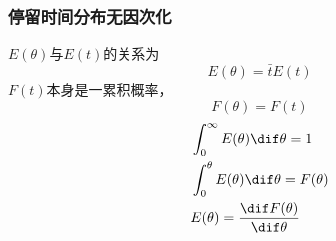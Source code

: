 \begin{frame}
    \frametitle{停留时间分布无因次化}

    $E(\theta)$与$E(t)$的关系为
    \[
        E(\theta) = \bar{t} E(t)
    \]
    $F(t)$本身是一累积概率，
    \[
        F(\theta) = F(t)
    \]
    \[
        \begin{aligned}
            &\int_0^\infty E(\theta)\dif \theta =1   \\
            &\int_0^\theta E(\theta)\dif \theta = F(\theta) \\
            &E(\theta) = \frac{\dif F(\theta)}{\dif \theta}
        \end{aligned}
    \]

\end{frame}